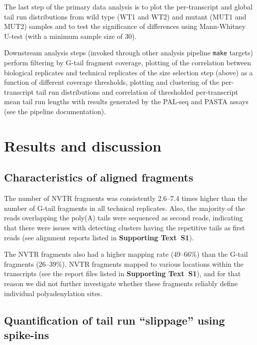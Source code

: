 \documentclass[10pt]{article}
\begin{document}
The last step of the primary data analysis is to plot the per-transcript and global tail run distributions from wild type (WT1 and WT2) and mutant (MUT1 and MUT2) samples and to test the significance of differences using Mann-Whitney U-test (with a minimum sample size of 30).

Downstream analysis steps (invoked through other analysis pipeline \texttt{make} targets) perform filtering by G-tail fragment coverage, plotting of the correlation between biological replicates and technical replicates of the size selection step (above) as a function of different coverage thresholds, plotting and clustering of the per-transcript tail run distributions and correlation of thresholded per-transcript mean tail run lengths with results generated by the PAL-seq \cite{subtelny14} and PASTA \cite{beilharz07} assays (see the pipeline documentation).

\section*{Results and discussion}

\subsection*{Characteristics of aligned fragments}

The number of NVTR fragments was consistently 2.6--7.4 times higher than the number of G-tail fragments in all technical replicates. Also, the majority of the reads overlapping the poly(A) tails were sequenced as second reads, indicating that there were issues with detecting clusters having the repetitive tails as first reads (see alignment reports listed in \textbf{Supporting Text~S1}).

The NVTR fragments also had a higher mapping rate (49--66\%) than the G-tail fragments (26--39\%).  NVTR fragments mapped to various locations within the transcripts (see the report files listed in \textbf{Supporting Text~S1}), and for that reason we did not further investigate whether these fragments reliably define individual polyadenylation sites.

\subsection*{Quantification of tail run ``slippage'' using spike-ins}
\end{document}
